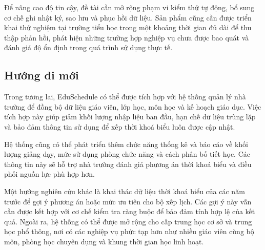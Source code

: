 \documentclass[../DoAn.tex]{subfiles}
\begin{document}
Để nâng cao độ tin cậy, đề tài cần mở rộng phạm vi kiểm thử tự động, bổ sung cơ
chế ghi nhật ký, sao lưu và phục hồi dữ liệu. Sản phẩm cũng cần được triển khai
thử nghiệm tại trường tiểu học trong một khoảng thời gian đủ dài để thu thập
phản hồi, phát hiện những trường hợp nghiệp vụ chưa được bao quát và đánh giá
độ ổn định trong quá trình sử dụng thực tế.

\subsection{Hướng đi mới}

Trong tương lai, EduSchedule có thể được tích hợp với hệ thống quản lý nhà
trường để đồng bộ dữ liệu giáo viên, lớp học, môn học và kế hoạch giáo dục. Việc
tích hợp này giúp giảm khối lượng nhập liệu ban đầu, hạn chế dữ liệu trùng lặp
và bảo đảm thông tin sử dụng để xếp thời khoá biểu luôn được cập nhật.

Hệ thống cũng có thể phát triển thêm chức năng thống kê và báo cáo về khối lượng
giảng dạy, mức sử dụng phòng chức năng và cách phân bố tiết học. Các thông tin
này sẽ hỗ trợ nhà trường đánh giá phương án thời khoá biểu và điều phối nguồn
lực phù hợp hơn.

Một hướng nghiên cứu khác là khai thác dữ liệu thời khoá biểu của các năm trước
để gợi ý phương án hoặc mức ưu tiên cho bộ xếp lịch. Các gợi ý này vẫn cần được
kết hợp với cơ chế kiểm tra ràng buộc để bảo đảm tính hợp lệ của kết quả. Ngoài
ra, hệ thống có thể được mở rộng cho cấp trung học cơ sở và trung học phổ thông,
nơi có các nghiệp vụ phức tạp hơn như nhiều giáo viên cùng bộ môn, phòng học
chuyên dụng và khung thời gian học linh hoạt.
\end{document}
